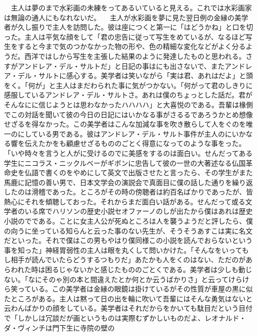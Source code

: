 \documentclass[a5j]{ltjbook}
\begin{document}
　主人は夢のまで水彩画の未練をってあるいていると見える。これでは水彩画家は無論の通人にもなれないだ。 \newline
　主人が水彩画を夢に見た翌日例の金縁の美学者が久し振りで主人を訪問した。彼は座につくと第一に「はどうかね」と口を切った。主人は平気な顔をして「君の忠告に従って写生をめているが、なるほど写生をすると今まで気のつかなかった物の形や、色の精細な変化などがよく分るようだ。西洋ではしから写生を主張した結果のように発達したものと思われる。さすがアンドレア・デル・サルトだ」と日記の事はにも出さないで、またアンドレア・デル・サルトに感心する。美学者は笑いながら「実は君、あれはだよ」と頭をく。「何が」と主人はまだわられた事に気がつかない。「何がって君のしきりに感服しているアンドレア・デル・サルトさ。あれは僕のちょっとした話だ。君がそんなにに信じようとは思わなかったハハハハ」と大喜悦のである。吾輩は椽側でこの対話を聞いて彼の今日の日記にはいかなる事がさるるであろうかとめ想像せざるを得なかった。この美学者はこんな加減な事を吹き散らして人をぐのを唯一のにしている男である。彼はアンドレア・デル・サルト事件が主人のにいかなる響を伝えたかをも顧慮せざるもののごとく得意になってのような事をった。「いや時々を言うと人がに受けるのでに美感をするのは面白い。せんだってある学生にニコラス・ニックルベーがギボンに忠告して彼の一世の大著述なる仏国革命史を仏語で書くのをやめにして英文で出版させたと言ったら、その学生がまた馬鹿に記憶の善い男で、日本文学会の演説会で真面目に僕の話した通りを繰り返したのは滑稽であった。ところがその時の傍聴者は約百名ばかりであったが、皆熱心にそれを傾聴しておった。それからまだ面白い話がある。せんだって或る文学者のいる席でハリソンの歴史小説セオファーノのしが出たから僕はあれは歴史小説のでである。ことに女主人公が死ぬところは人を襲うようだと評したら、僕の向うに坐っている知らんと云った事のない先生が、そうそうあすこは実に名文だといった。それで僕はこの男もやはり僕同様この小説を読んでおらないという事を知った」神経胃弱性の主人は眼を丸くして問いかけた。「そんなをいってもし相手が読んでいたらどうするつもりだ」あたかも人をくのはない、ただのがあらわれた時は困るじゃないかと感じたもののごとくである。美学者は少しも動じない。「なにそのゃ別の本と間違えたとか何とか云うばかりさ」と云ってけらけら笑っている。この美学者は金縁の眼鏡は掛けているがその性質が車屋の黒に似たところがある。主人は黙って日の出を輪に吹いて吾輩にはそんな勇気はないと云わんばかりの顔をしている。美学者はそれだからをかいても駄目だという目付で「しかしは冗談だが画というものは実際むずかしいものだよ、レオナルド・ダ・ヴィンチは門下生に寺院の壁の
\end{document}

